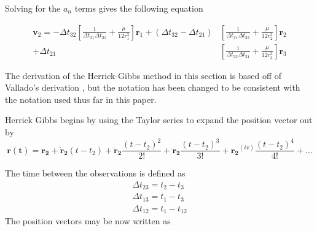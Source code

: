 \documentclass[12pt]{article}
\begin{document}
	Solving for the $a_n$ terms gives the following equation
	
	\begin{equation}
	\begin{aligned} \mathbf { v } _ { 2 } = - \Delta t _ { 32 } \left[ \frac { 1 } { \Delta t _ { 21 } \Delta t _ { 31 } } + \frac { \mu } { 12 r _ { 1 } ^ { 3 } } \right] \mathbf { r } _ { 1 } + \left( \Delta t _ { 32 } - \Delta t _ { 21 } \right) & \left[ \frac { 1 } { \Delta t _ { 21 } \Delta t _ { 32 } } + \frac { \mu } { 12 r _ { 2 } ^ { 3 } } \right] \mathbf { r } _ { 2 } \\ + \Delta t _ { 21 } & \left[\frac { 1 } { \Delta t _ { 32 } \Delta t _ { 31 } } + \frac { \mu } { 12 r _ { 3 } ^ { 3 } } \right] \mathbf { r } _ { 3 } \end{aligned}
	\label{eqn:HGREF}
	\end{equation}
	
	
	\iffalse
	
	
	The derivation of the Herrick-Gibbs method in this section is based off of Vallado's derivation \cite{vallado2007fundamentals}, but the notation has been changed to be consistent with the notation used thus far in this paper. 
	
		Herrick Gibbs begins by using the Taylor series to expand the position vector out by 
		\begin{equation}
		\mathbf{r(t)}=\mathbf{r_2}+\mathbf{\dot{r}_2} (t-t_2) + \mathbf{\ddot{r}_2} \frac{(t-t_2)^2}{2!}+ \mathbf{\dddot{r}_2} \frac{(t-t_2)^3}{3!}+ \mathbf{{r_2}}^{(iv)} \frac{(t-t_2)^4}{4!}+\dots
		\end{equation}
		
		The time between the observations is defined as 
		\begin{equation}
		\begin{array} { l } { \Delta t _ { 23 } = t _ { 2 } - t _ { 3 } } \\ { \Delta t _ { 13 } = t _ { 1 } - t _ { 3 } } \\ { \Delta t _ { 12 } = t _ { 1 } - t _ { 12 } } \end{array}
		\end{equation}
		The position vectors may be now written as 
		
\end{document}
